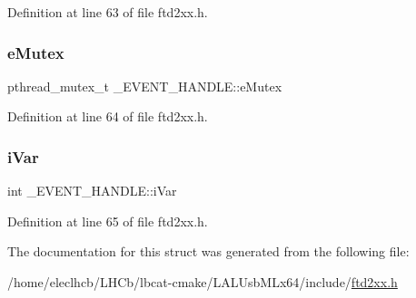 Definition at line 63 of file ftd2xx.\+h.

\mbox{\label{struct__EVENT__HANDLE_ac18c63dbb1acc29ff1104b80fe7b4269}} 
\subsubsection{\texorpdfstring{e\+Mutex}{eMutex}}
{\footnotesize\ttfamily pthread\+\_\+mutex\+\_\+t \+\_\+\+E\+V\+E\+N\+T\+\_\+\+H\+A\+N\+D\+L\+E\+::e\+Mutex}



Definition at line 64 of file ftd2xx.\+h.

\mbox{\label{struct__EVENT__HANDLE_aa96bc22ec0f4f46df8e3ad9f1bbb7baa}} 
\subsubsection{\texorpdfstring{i\+Var}{iVar}}
{\footnotesize\ttfamily int \+\_\+\+E\+V\+E\+N\+T\+\_\+\+H\+A\+N\+D\+L\+E\+::i\+Var}



Definition at line 65 of file ftd2xx.\+h.



The documentation for this struct was generated from the following file\+:\begin{DoxyCompactItemize}
\item 
/home/eleclhcb/\+L\+H\+Cb/lbcat-\/cmake/\+L\+A\+L\+Usb\+M\+Lx64/include/\hyperlink{LALUsbMLx64_2include_2ftd2xx_8h}{ftd2xx.\+h}\end{DoxyCompactItemize}
